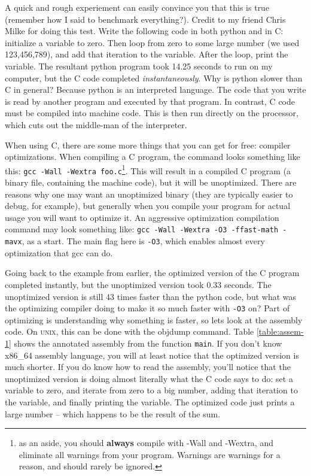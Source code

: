 A quick and rough experiement can easily convince you that this is true (remember how I said to
benchmark everything?). Credit to my friend Chris Milke for doing this test. Write the following
code in both python and in C: initialize a variable to zero. Then loop from zero to some large
number (we used 123,456,789), and add that iteration to the variable. After the loop, print the
variable. The resultant python program took 14.25 seconds to run on my computer, but the C code
completed \textit{instantaneously}. Why is python slower than C in general? Because python is
an interpreted language. The code that you write is read by another program and executed by
that program. In contrast, C code must be compiled into machine code. This is then run directly
on the processor, which cuts out the middle-man of the interpreter.

When using C, there are some more things that you can get for free: compiler optimizations. When
compiling a C program, the command looks something like this: \texttt{gcc -Wall -Wextra foo.c}\footnote{as an aside, you should \textbf{always} compile with -Wall and -Wextra, and eliminate all warnings from your program.
Warnings are warnings for a reason, and should rarely be ignored.}. This will
result in a compiled C program (a binary file, containing the machine code), but it will be
unoptimized. There are reasons why one may want an unoptimized binary (they are typically
easier to debug, for example), but generally when you compile your program for actual usage
you will want to optimize it. An aggressive optimization compilation command may look something
like: \texttt{gcc -Wall -Wextra -O3 -ffast-math -mavx}, as a start. The main flag here is \texttt{-O3}, which
enables almost every optimization that gcc can do.

Going back to the example from earlier, the optimized version of the C program completed instantly, but
the unoptimized version took 0.33 seconds. The unoptimized version is still 43 times faster than the
python code, but what was the optimizing compiler doing to make it so much faster with \texttt{-O3} on?
Part of optimizing is understanding why something is faster, so lets look at the assembly code. On \textsc{unix},
this can be done with the objdump command. Table \ref{table:assem-1} shows the annotated assembly from
the function \texttt{main}. If you don't know x86\_64 assembly language, you will at least notice that the
optimized version is much shorter. If you do know how to read the assembly, you'll notice that the unoptimized
version is doing almost literally what the C code says to do: set a variable to zero, and iterate from zero to
a big number, adding that iteration to the variable, and finally printing the variable. The optimized code just prints a large number -- which happens to be the result of the sum.

